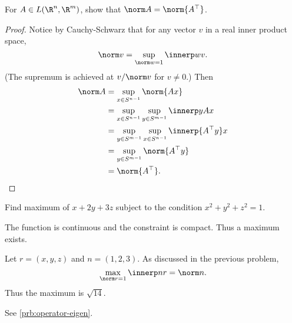 \documentclass[12pt]{article}
\begin{document}
\begin{problem}
    For $A \in L(\R^n, \R^m)$, show that $\norm A = \norm{A^\T}$.
\end{problem}
\begin{proof}
    Notice by Cauchy-Schwarz that for any vector $v$ in a real inner product
    space, \[
        \norm v = \sup_{\norm w = 1} \innerp wv.
    \] (The supremum is achieved at $v / \norm v$ for $v \ne 0$.)
    Then \begin{align*}
        \norm A &= \sup_{x \in S^{n-1}} \norm{Ax} \\
        &= \sup_{x \in S^{n-1}} \sup_{y \in S^{m-1}} \innerp y{Ax} \\
        &= \sup_{y \in S^{m-1}} \sup_{x \in S^{n-1}} \innerp{A^\T y}x \\
        &= \sup_{y \in S^{m-1}} \norm{A^\T y} \\
        &= \norm{A^\T}. \qedhere
    \end{align*}
\end{proof}

\begin{problem}
    Find maximum of $x + 2y + 3z$ subject to the condition
    $x^2 + y^2 + z^2 = 1$.
\end{problem}
\begin{solution}
    The function is continuous and the constraint is compact.
    Thus a maximum exists.

    Let $r = (x, y, z)$ and $n = (1, 2, 3)$.
    As discussed in the previous problem, \[
        \max_{\norm r = 1} \innerp nr = \norm n.
    \] Thus the maximum is $\sqrt{14}$.
\end{solution}

\begin{problem}
    See \cref{prb:operator-eigen}.
\end{problem}
\end{document}
